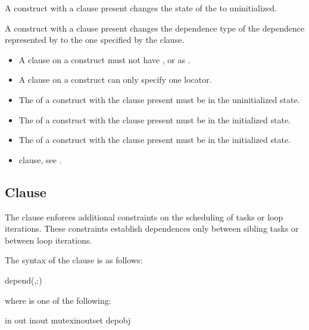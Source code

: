 A  construct with a  clause present changes the 
state of the  to uninitialized.

A  construct with a  clause present changes the 
dependence type of the dependence represented by  to the one 
specified by the  clause.

\restrictions
\begin{itemize}
\item A  clause on a  construct must not have 
      ,  or  as .
\item A  clause on a  construct can only specify 
      one locator.
\item The  of a  construct with the  
      clause present must be in the uninitialized state.
\item The  of a  construct with the  
      clause present must be in the initialized state.
\item The  of a  construct with the  
      clause present must be in the initialized state.
\end{itemize}

\crossreferences
\begin{itemize}
 \item {} clause, see .
\end{itemize}



\subsection{ Clause}
\label{subsec:depend Clause}
\summary
The  clause enforces additional constraints on the scheduling of tasks or loop iterations.  These
constraints establish dependences only between sibling tasks or between loop iterations.

\syntax
The syntax of the  clause is as follows:

\begin{ompSyntax}
depend(\plc{[depend-modifier},\plc{]dependence-type }:)
\end{ompSyntax}

where  is one of the following:
\begin{indentedcodelist}
in
out
inout
mutexinoutset
depobj
\end{indentedcodelist}

